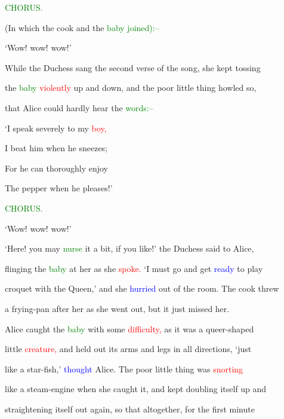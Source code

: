  \textcolor{green}{CHORUS.}



 (In which the cook and the \textcolor{green}{baby} \textcolor{green}{joined):--}



 ‘Wow! wow! wow!’



 While the Duchess sang the second verse of the song, she kept tossing

 the \textcolor{green}{baby} \textcolor{red}{violently} up and down, and the poor little thing \textcolor{BurntOrange}{howled} so,

 that Alice could hardly hear the \textcolor{green}{words:--}



 ‘I speak severely to my \textcolor{red}{boy,}

 I beat him when he \textcolor{BurntOrange}{sneezes;}

 For he can thoroughly \textcolor{BurntOrange}{enjoy}

 The pepper when he \textcolor{BurntOrange}{pleases!’}



 \textcolor{green}{CHORUS.}



 ‘Wow! wow! wow!’



 ‘Here! you may \textcolor{green}{nurse} it a bit, if you like!’ the Duchess said to Alice,

 flinging the \textcolor{green}{baby} at her as she \textcolor{red}{spoke.} ‘I must go and get \textcolor{blue}{ready} to play

 croquet with the Queen,’ and she \textcolor{blue}{hurried} out of the room. The cook threw

 a frying-pan after her as she went out, but it just missed her.



 Alice caught the \textcolor{green}{baby} with some \textcolor{red}{difficulty,} as it was a queer-shaped

 little \textcolor{red}{creature,} and held out its arms and legs in all directions, ‘just

 like a star-fish,’ \textcolor{blue}{thought} Alice. The poor little thing was \textcolor{red}{snorting}

 like a steam-engine when she caught it, and kept doubling itself up and

 straightening itself out again, so that altogether, for the first minute

